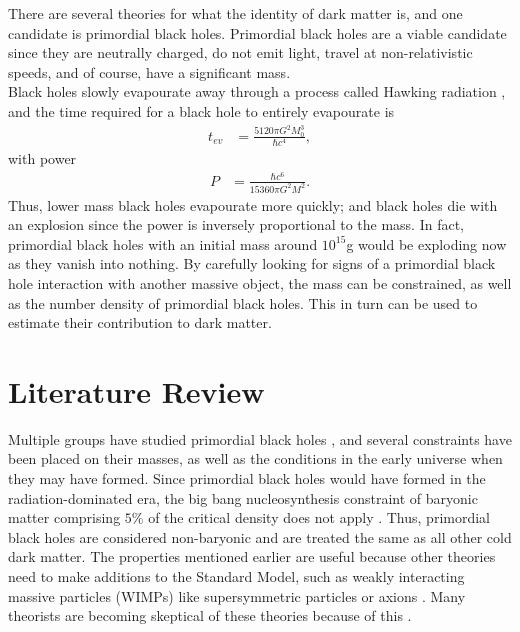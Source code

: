 There are several theories for what the identity of dark matter is, and one candidate is primordial black holes. Primordial black holes are a viable candidate since they are neutrally charged, do not emit light, travel at non-relativistic speeds, and of course, have a significant mass. \\

Black holes slowly evapourate away through a process called Hawking radiation \cite{hawking}, and the time required for a black hole to entirely evapourate is 
\begin{align*}
t_{ev} &= \frac{5120 \pi G^2 M_0^3}{\hbar c^4},
\end{align*}
with power
\begin{align*}
P &= \frac{\hbar c^6}{15360 \pi G^2 M^2}.
\end{align*}
Thus, lower mass black holes evapourate more quickly; and black holes die with an explosion since the power is inversely proportional to the mass. In fact, primordial black holes with an initial mass around $10^{15}$g would be exploding now as they vanish into nothing. By carefully looking for signs of a primordial black hole interaction with another massive object, the mass can be constrained, as well as the number density of primordial black holes. This in turn can be used to estimate their contribution to dark matter.

\section{Literature Review}

Multiple groups have studied primordial black holes \cite{bigpaper}, and several constraints have been placed on their masses, as well as the conditions in the early universe when they may have formed. Since primordial black holes would have formed in the radiation-dominated era, the big bang nucleosynthesis constraint of baryonic matter comprising $5\%$ of the critical density does not apply \cite{critdens, cosmology}. Thus, primordial black holes are considered non-baryonic and are treated the same as all other cold dark matter. The properties mentioned earlier are useful because other theories need to make additions to the Standard Model, such as weakly interacting massive particles (WIMPs) like supersymmetric particles or axions \cite{supersym}. Many theorists are becoming skeptical of these theories because of this \cite{pessimism}. \\

